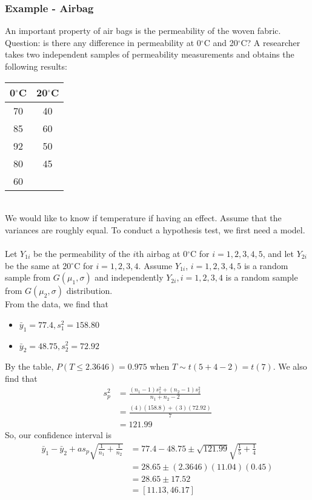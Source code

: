 \documentclass[12pt]{article}
\begin{document}
\subsubsection{Example - Airbag}
An important property of air bags is the permeability of the woven fabric. Question: is there any difference in permeability at 0$^\circ$C and 20$^\circ$C? A researcher takes two independent samples of permeability measurements and obtains the following results:\\
\begin{tabular}{c|c}
    0$^\circ$C & 20$^\circ$C\\\hline
    70 & 40\\
    85 & 60\\
    92 & 50\\
    80 & 45\\
    60 &
\end{tabular}\\
We would like to know if temperature if having an effect. Assume that the variances are roughly equal. To conduct a hypothesis test, we first need a model.\\\\
Let $Y_{1i}$ be the permeability of the $i$th airbag at 0$^\circ$C for $i=1,2,3,4,5$, and let $Y_{2i}$ be the same at 20$^\circ$C for $i=1,2,3,4$. Assume $Y_{1i}$, $i=1,2,3,4,5$ is a random sample from $G(\mu_1,\sigma)$ and independently $Y_{2i},i=1,2,3,4$ is a random sample from $G(\mu_2,\sigma)$ distribution.\\
From the data, we find that
\begin{itemize}
    \item $\bar y_1=77.4, s_1^2=158.80$
    \item $\bar y_2=48.75, s_2^2=72.92$
\end{itemize}
By the table, $P(T\leq 2.3646)=0.975$ when $T\sim t(5+4-2)=t(7)$. We also find that
\begin{align*}
    s_p^2&=\frac{(n_1-1)s_1^2+(n_2-1)s_2^2}{n_1+n_2-2}\\
    &=\frac{(4)(158.8)+(3)(72.92)}{7}\\
    &=121.99
\end{align*}
So, our confidence interval is
\begin{align*}
    \bar y_1-\bar y_2+as_p\sqrt{\frac{1}{n_1}+\frac{1}{n_2}}&=77.4-48.75\pm \sqrt{121.99}\sqrt{\frac{1}{5}+\frac{1}{4}}\\
    &=28.65\pm (2.3646)(11.04)(0.45)\\
    &=28.65\pm 17.52\\
    &=[11.13, 46.17]
\end{align*}
\end{document}
